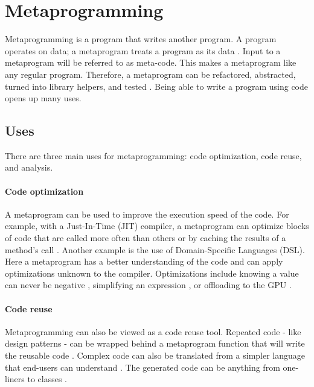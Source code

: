 \section{Metaprogramming}
Metaprogramming is a program that writes another program.
A program operates on data; a metaprogram treats a program as its data \cite{savidis_19_01, anggoro_17_01, sheard_01_01}.
Input to a metaprogram will be referred to as meta-code.
This makes a metaprogram like any regular program.
Therefore, a metaprogram can be refactored, abstracted, turned into library helpers, and tested \cite{lilis_15_01}.
Being able to write a program using code opens up many uses.



\subsection{Uses}
There are three main uses for metaprogramming: code optimization, code reuse, and analysis.

\paragraph{Code optimization}
A metaprogram can be used to improve the execution speed of the code.
For example, with a Just-In-Time (JIT) compiler, a metaprogram can optimize blocks of code that are called more often than others \cite{hinsen_13_01} or by caching the results of a method's call \cite{seaton_15_01}.
Another example is the use of Domain-Specific Languages (DSL). 
Here a metaprogram has a better understanding of the code and can apply optimizations unknown to the compiler.
Optimizations include knowing a value can never be negative \cite{hinsen_13_01}, simplifying an expression \cite{sheard_01_01}, or offloading to the GPU \cite{videau_18_01}.

\paragraph{Code reuse}
Metaprogramming can also be viewed as a code reuse tool.
Repeated code - like design patterns \cite{lilis_15_01, alexandrescu_01_01} - can be wrapped behind a metaprogram function that will write the reusable code \cite{savidis_19_01, klabnik_2019_01}.
Complex code can also be translated from a simpler language that end-users can understand \cite{hinsen_13_01}.
The generated code can be anything from one-liners to classes \cite{savidis_19_01}.

